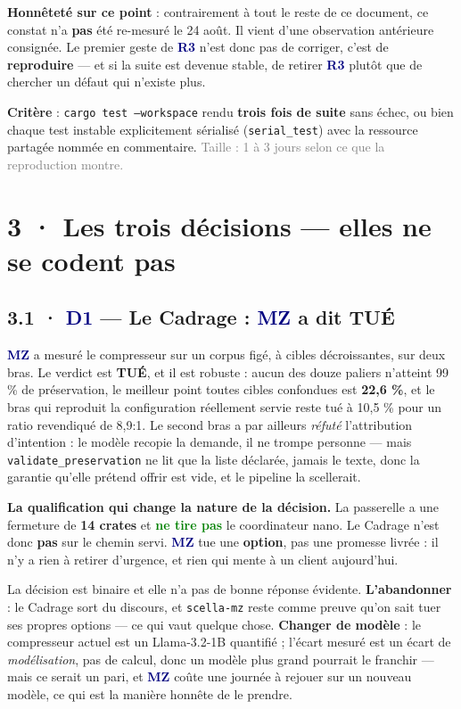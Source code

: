 \documentclass[10pt]{article}
\newcommand{\best}[1]{\textcolor{green}{\textbf{#1}}}
\newcommand{\sz}[1]{\textcolor{grey}{\small\textsf{#1}}}
\newcommand{\code}[1]{\texttt{\small #1}}
\newcommand{\mm}[1]{\textbf{\textcolor{navy}{#1}}}
\begin{document}
\begin{alerte}
\textbf{Honnêteté sur ce point} : contrairement à tout le reste de ce document, ce constat n'a
\textbf{pas} été re-mesuré le 24 août. Il vient d'une observation antérieure consignée. Le premier
geste de \mm{R3} n'est donc pas de corriger, c'est de \textbf{reproduire} --- et si la suite est
devenue stable, de retirer \mm{R3} plutôt que de chercher un défaut qui n'existe plus.
\end{alerte}

\textbf{Critère} : \code{cargo test --workspace} rendu \textbf{trois fois de suite} sans échec, ou
bien chaque test instable explicitement sérialisé (\code{serial\_test}) avec la ressource partagée
nommée en commentaire. \sz{Taille : 1 à 3 jours selon ce que la reproduction montre.}

\section{3 · Les trois décisions --- elles ne se codent pas}

\subsection{3.1 · \mm{D1} --- Le Cadrage : \mm{MZ} a dit TUÉ}

\mm{MZ} a mesuré le compresseur sur un corpus figé, à cibles décroissantes, sur deux bras. Le
verdict est \textbf{TUÉ}, et il est robuste : aucun des douze paliers n'atteint 99 \% de
préservation, le meilleur point toutes cibles confondues est \textbf{22,6 \%}, et le bras qui
reproduit la configuration réellement servie reste tué à 10,5 \% pour un ratio revendiqué de 8,9:1.
Le second bras a par ailleurs \emph{réfuté} l'attribution d'intention : le modèle recopie la
demande, il ne trompe personne --- mais \code{validate\_preservation} ne lit que la liste déclarée,
jamais le texte, donc la garantie qu'elle prétend offrir est vide, et le pipeline la scellerait.

\begin{acquis}
\textbf{La qualification qui change la nature de la décision.} La passerelle a une fermeture de
\textbf{14 crates} et \best{ne tire pas} le coordinateur nano. Le Cadrage n'est donc \textbf{pas}
sur le chemin servi. \mm{MZ} tue une \textbf{option}, pas une promesse livrée : il n'y a rien à
retirer d'urgence, et rien qui mente à un client aujourd'hui.
\end{acquis}

La décision est binaire et elle n'a pas de bonne réponse évidente. \textbf{L'abandonner} : le
Cadrage sort du discours, et \code{scella-mz} reste comme preuve qu'on sait tuer ses propres
options --- ce qui vaut quelque chose. \textbf{Changer de modèle} : le compresseur actuel est un
Llama-3.2-1B quantifié ; l'écart mesuré est un écart de \emph{modélisation}, pas de calcul, donc un
modèle plus grand pourrait le franchir --- mais ce serait un pari, et \mm{MZ} coûte une journée à
rejouer sur un nouveau modèle, ce qui est la manière honnête de le prendre.
\end{document}
